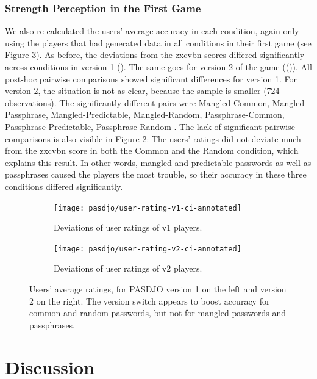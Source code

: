 \subsubsection{Strength Perception in the First Game}
We also re-calculated the users' average accuracy in each condition, again only using the players that had generated data in all conditions in their first game (see Figure \ref{fig:pasdjo:v1-v2-deviations}). As before, the deviations from the zxcvbn scores differed significantly across conditions in version 1 (). The same goes for version 2 of the game (()). All post-hoc pairwise comparisons showed significant differences  for version 1. For version 2, the situation is not as clear, because the sample is smaller (724 observations). The significantly different pairs were Mangled-Common, Mangled-Passphrase, Mangled-Predictable, Mangled-Random, Passphrase-Common, Passphrase-Predictable, Passphrase-Random . The lack of significant pairwise comparisons is also visible in Figure \ref{fig:pasdjo:v2-performance}: The users' ratings did not deviate much from the zxcvbn score in both the Common and the Random condition, which explains this result. In other words, mangled and predictable passwords as well as passphrases caused the players the most trouble, so their accuracy in these three conditions differed significantly. 
\begin{figure}[htbp]
	\begin{subfigure}[t]{0.49\linewidth}
		\texttt{[image: pasdjo/user-rating-v1-ci-annotated]}
		\caption{\label{fig:pasdjo:1y-performance}Deviations of user ratings of v1 players.}
	\end{subfigure}
	\begin{subfigure}[t]{0.49\linewidth}
		\texttt{[image: pasdjo/user-rating-v2-ci-annotated]}
		\caption{\label{fig:pasdjo:v2-performance}Deviations of user ratings of v2 players.}
	\end{subfigure}
	\caption{\label{fig:pasdjo:v1-v2-deviations} Users' average ratings, for PASDJO version 1 on the left and version 2 on the right. The version switch appears to boost accuracy for common and random passwords, but not for mangled passwords and passphrases.}
\end{figure}



\section{Discussion}

